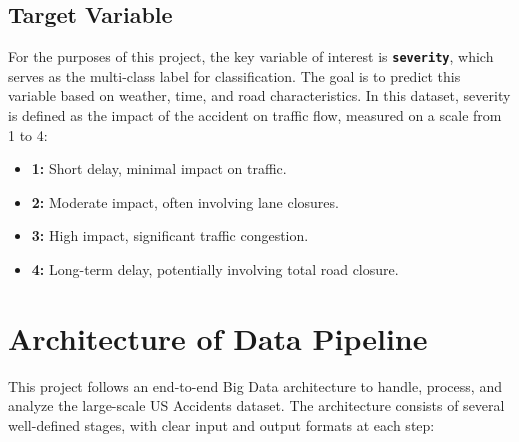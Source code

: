 \documentclass[11pt,a4paper]{article}
\begin{document}
\subsection*{Target Variable}
For the purposes of this project, the key variable of interest is \textbf{\texttt{severity}}, which serves as the multi-class label for classification. The goal is to predict this variable based on weather, time, and road characteristics. In this dataset, severity is defined as the impact of the accident on traffic flow, measured on a scale from 1 to 4:
\begin{itemize}
    \item \textbf{1:} Short delay, minimal impact on traffic.
    \item \textbf{2:} Moderate impact, often involving lane closures.
    \item \textbf{3:} High impact, significant traffic congestion.
    \item \textbf{4:} Long-term delay, potentially involving total road closure.
\end{itemize}
\section{Architecture of Data Pipeline}

This project follows an end-to-end Big Data architecture to handle, process, and analyze the large-scale US Accidents dataset. The architecture consists of several well-defined stages, with clear input and output formats at each step:
\end{document}
